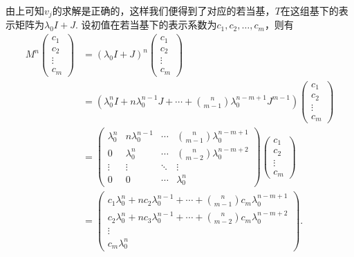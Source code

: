 由上可知$v_j$的求解是正确的，这样我们便得到了对应的若当基，$T$在这组基下的表示矩阵为$\lambda_0 I + J$. 设初值在若当基下的表示系数为$c_1, c_2, \ldots, c_m$，则有 \begin{align*}
    M^n \begin{pmatrix}
        c_1 \\ c_2 \\ \vdots \\ c_m
    \end{pmatrix}
    & = (\lambda_0 I + J)^n \begin{pmatrix}
        c_1 \\ c_2 \\ \vdots \\ c_m
    \end{pmatrix} \\ & = (\lambda_0^n I + n \lambda_0^{n - 1} J + \cdots + \binom{n}{m - 1} \lambda_0^{n - m + 1} J^{m - 1}) \begin{pmatrix}
        c_1 \\ c_2 \\ \vdots \\ c_m
    \end{pmatrix} \\
    & = \begin{pmatrix}
        \lambda_0^n & n \lambda_0^{n - 1} & \cdots & \binom{n}{m - 1} \lambda_0^{n - m + 1} \\
        0 & \lambda_0^n & \cdots & \binom{n}{m - 2} \lambda_0^{n - m + 2} \\
        \vdots & \vdots & \ddots & \vdots \\
        0 & 0 & \cdots & \lambda_0^n
    \end{pmatrix} \begin{pmatrix}
        c_1 \\ c_2 \\ \vdots \\ c_m
    \end{pmatrix} \\ & = \begin{pmatrix}
        c_1 \lambda_0^n + n c_2 \lambda_0^{n - 1} + \cdots + \binom{n}{m - 1} c_m \lambda_0^{n - m + 1} \\
        c_2 \lambda_0^n + n c_3 \lambda_0^{n - 1} + \cdots + \binom{n}{m - 2} c_m \lambda_0^{n - m + 2} \\
        \vdots \\
        c_m \lambda_0^n
    \end{pmatrix}.
\end{align*}

